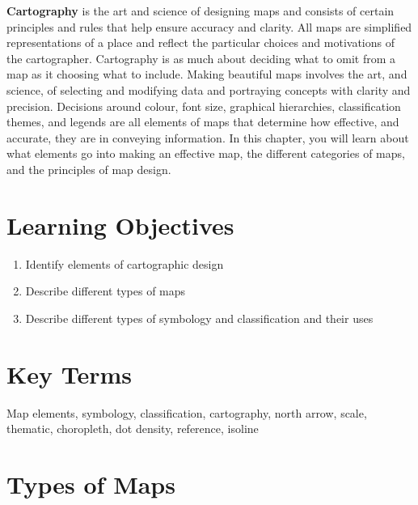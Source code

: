 \documentclass[
]{book}
\providecommand{\tightlist}{%
  \setlength{\itemsep}{0pt}\setlength{\parskip}{0pt}}
\begin{document}
\textbf{Cartography} is the art and science of designing maps and consists of certain principles and rules that help ensure accuracy and clarity. All maps are simplified representations of a place and reflect the particular choices and motivations of the cartographer. Cartography is as much about deciding what to omit from a map as it choosing what to include. Making beautiful maps involves the art, and science, of selecting and modifying data and portraying concepts with clarity and precision. Decisions around colour, font size, graphical hierarchies, classification themes, and legends are all elements of maps that determine how effective, and accurate, they are in conveying information. In this chapter, you will learn about what elements go into making an effective map, the different categories of maps, and the principles of map design.

\hypertarget{learning-objectives-15}{%
\section*{Learning Objectives}\label{learning-objectives-15}}

\begin{enumerate}
\def\labelenumi{\arabic{enumi}.}
\tightlist
\item
  Identify elements of cartographic design
\item
  Describe different types of maps
\item
  Describe different types of symbology and classification and their uses
\end{enumerate}

\hypertarget{key-terms-15}{%
\section*{Key Terms}\label{key-terms-15}}

Map elements, symbology, classification, cartography, north arrow, scale, thematic, choropleth, dot density, reference, isoline

\hypertarget{types-of-maps}{%
\section{Types of Maps}\label{types-of-maps}}
\end{document}
